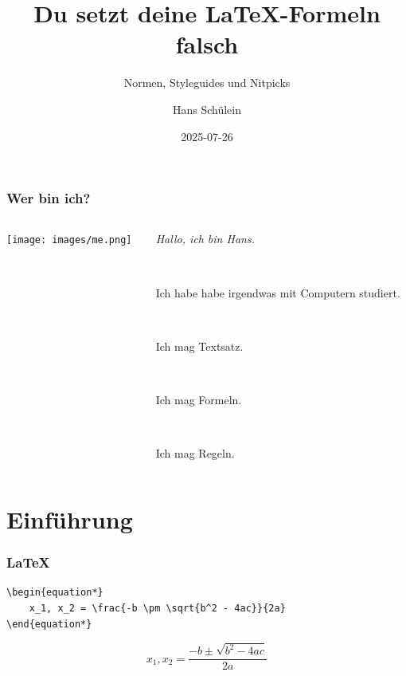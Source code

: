 \documentclass{beamer}
\begin{document}
\title{Du setzt deine \LaTeX-Formeln falsch}
\subtitle{Normen, Styleguides und Nitpicks}
\author{Hans Schülein}
\date{2025-07-26}

\begin{frame}[fragile]
    \titlepage
\end{frame}

\begin{frame}[fragile]
    \frametitle{Wer bin ich?}
    \begin{columns}
        \begin{column}{0.5\textwidth}
            \texttt{[image: images/me.png]}
        \end{column}
        \begin{column}{0.5\textwidth}
            \textit{Hallo, ich bin Hans.}

            ~

            Ich habe habe irgendwas mit Computern studiert.

            ~

            Ich mag Textsatz.

            ~

            Ich mag Formeln.

            ~

            Ich mag Regeln.
        \end{column}
    \end{columns}
\end{frame}

\section{Einführung}

\begin{frame}[fragile]
    \frametitle{\LaTeX}
    \begin{lstlisting}
\begin{equation*}
    x_1, x_2 = \frac{-b \pm \sqrt{b^2 - 4ac}}{2a}
\end{equation*}
    \end{lstlisting}

    \begin{equation*}
        x_1, x_2 = \frac{-b \pm \sqrt{b^2 - 4ac}}{2a}
    \end{equation*}
\end{frame}
\end{document}

